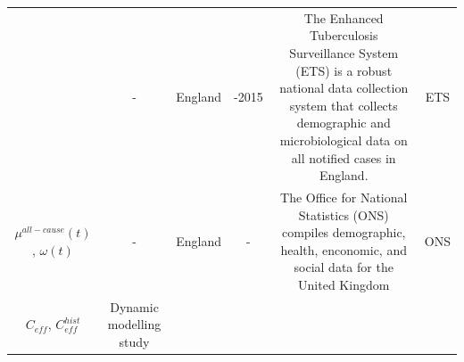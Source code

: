 \documentclass[11pt,twoside]{bristolthesis}
\begin{document}
\begin{longtable}[]{@{}cccccc@{}}
\begin{minipage}[t]{0.16\columnwidth}
  \end{minipage} & \begin{minipage}[t]{0.11\columnwidth}\centering
  -\strut
  \end{minipage} & \begin{minipage}[t]{0.08\columnwidth}\centering
  England\strut
  \end{minipage} & \begin{minipage}[t]{0.08\columnwidth}\centering
  2000-2015\strut
  \end{minipage} & \begin{minipage}[t]{0.29\columnwidth}\centering
  The Enhanced Tuberculosis Surveillance
  System (ETS) is a robust national data
  collection system that collects
  demographic and microbiological data on
  all notified cases in England.\strut
  \end{minipage} & \begin{minipage}[t]{0.12\columnwidth}\centering
  ETS\strut
  \end{minipage}\tabularnewline
  \begin{minipage}[t]{0.16\columnwidth}\centering
  \(\mu^{all-cause}(t)\),
  \(\omega(t)\)\strut
  \end{minipage} & \begin{minipage}[t]{0.11\columnwidth}\centering
  -\strut
  \end{minipage} & \begin{minipage}[t]{0.08\columnwidth}\centering
  England\strut
  \end{minipage} & \begin{minipage}[t]{0.08\columnwidth}\centering
  -\strut
  \end{minipage} & \begin{minipage}[t]{0.29\columnwidth}\centering
  The Office for National Statistics (ONS)
  compiles demographic, health, enconomic,
  and social data for the United Kingdom\strut
  \end{minipage} & \begin{minipage}[t]{0.12\columnwidth}\centering
  ONS\strut
  \end{minipage}\tabularnewline
  \begin{minipage}[t]{0.16\columnwidth}\centering
  \(C_{eff}\),
  \(C^{hist}_{eff}\)\strut
  \end{minipage} & \begin{minipage}[t]{0.11\columnwidth}\centering
  Dynamic
  modelling
  study\strut
  \end{minipage} & \begin{minipage}[t]{0.08\columnwidth}\centering

\end{minipage}
\end{longtable}
\end{document}
